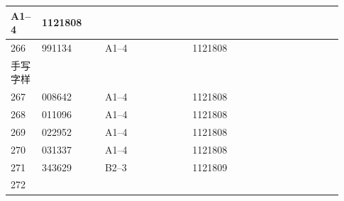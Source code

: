 \documentclass[UTF8,10pt,a4paper,fontset=fandol]{ctexart}
\newcommand{\fieldvalue}[1]{#1}
\newcommand{\handwritten}[1]{#1}
\begin{document}
\begin{center}
\begin{tabular}{|p{0.07\linewidth}|p{0.18\linewidth}|p{0.25\linewidth}|p{0.25\linewidth}|p{0.18\linewidth}|}
\fieldvalue{A1--4} &
\fieldvalue{1121808} & \\ \hline
\fieldvalue{266} &
\fieldvalue{991134} &
\fieldvalue{A1--4} &
\fieldvalue{1121808} & \\ \hline
\fieldvalue{\handwritten{手写字样}} \\ \hline
\fieldvalue{267} &
\fieldvalue{008642} &
\fieldvalue{A1--4} &
\fieldvalue{1121808} & \\ \hline
\fieldvalue{268} &
\fieldvalue{011096} &
\fieldvalue{A1--4} &
\fieldvalue{1121808} & \\ \hline
\fieldvalue{269} &
\fieldvalue{022952} &
\fieldvalue{A1--4} &
\fieldvalue{1121808} & \\ \hline
\fieldvalue{270} &
\fieldvalue{031337} &
\fieldvalue{A1--4} &
\fieldvalue{1121808} & \\ \hline
\fieldvalue{271} &
\fieldvalue{343629} &
\fieldvalue{B2--3} &
\fieldvalue{1121809} & \\ \hline
\fieldvalue{272} &

\end{tabular}
\end{center}
\end{document}
